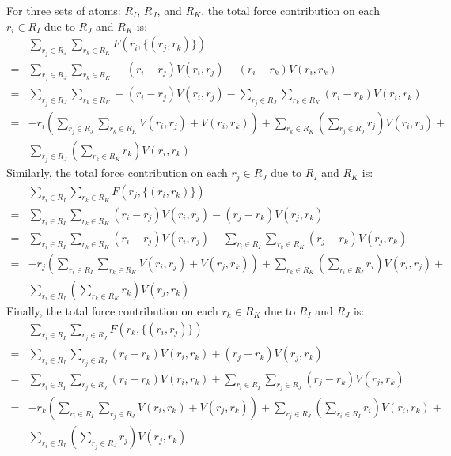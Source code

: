 \documentclass[letterpaper,12pt]{article}
\begin{document}
For three sets of atoms: $R_I$, $R_J$, and $R_K$, the total force
contribution on each $r_i \in R_I$ due to $R_J$ and $R_K$ is:
\begin{align*}
& \sum\limits_{r_j \in R_J} \sum\limits_{r_k \in R_K} F(r_i, \{ (r_j,
r_k) \}) \\
=& \sum\limits_{r_j \in R_J} \sum\limits_{r_k \in R_K} -(r_i -
r_j) V(r_i, r_j) - (r_i - r_k) V(r_i, r_k)\\
=& \sum\limits_{r_j \in R_J} \sum\limits_{r_k \in R_K} -(r_i -
r_j) V(r_i, r_j) - \sum\limits_{r_j \in R_J} \sum\limits_{r_k \in
  R_K} (r_i - r_k) V(r_i, r_k)\\
=&- r_i \left( \sum\limits_{r_j \in R_J} \sum\limits_{r_k \in R_K} V(r_i, r_j) 
+ V(r_i, r_k) \right) +
\sum\limits_{r_k \in R_K} \left( \sum\limits_{r_j \in R_J} r_j \right)
V(r_i, r_j) +\\
& \sum\limits_{r_j \in R_J} \left( \sum\limits_{r_k \in R_K} r_k \right)
V(r_i, r_k)
\end{align*}
Similarly, the total force contribution on each $r_j \in R_J$ due to
$R_I$ and $R_K$ is:
\begin{align*}
& \sum\limits_{r_i \in R_I} \sum\limits_{r_k \in R_K} F(r_j, \{ (r_i,
r_k) \})\\
=& \sum\limits_{r_i \in R_I} \sum\limits_{r_k \in R_K} (r_i - r_j)
V(r_i, r_j) - (r_j - r_k) V(r_j, r_k)\\
=& \sum\limits_{r_i \in R_I} \sum\limits_{r_k \in R_K} (r_i - r_j)
V(r_i, r_j) - \sum\limits_{r_i \in R_I} \sum\limits_{r_k \in R_K} (r_j
- r_k) V(r_j, r_k)\\
=&- r_j \left( \sum\limits_{r_i \in R_I} \sum\limits_{r_k \in R_K}
V(r_i, r_j) + V(r_j, r_k) \right) + \sum\limits_{r_k \in R_K} \left(
\sum\limits_{r_i \in R_I} r_i \right) V(r_i, r_j) +\\ 
& \sum\limits_{r_i \in R_I} \left( \sum\limits_{r_k \in R_K} r_k \right)
V(r_j, r_k)
\end{align*}
Finally, the total force contribution on each $r_k \in R_K$ due to
$R_I$ and $R_J$ is:
\begin{align*}
& \sum\limits_{r_i \in R_I} \sum\limits_{r_j \in R_J} F(r_k, \{ (r_i,
r_j) \})\\
=& \sum\limits_{r_i \in R_I} \sum\limits_{r_j \in R_J} (r_i - r_k)
V(r_i, r_k) + (r_j - r_k) V(r_j, r_k)\\
=& \sum\limits_{r_i \in R_I} \sum\limits_{r_j \in R_J} (r_i - r_k)
V(r_i, r_k) + \sum\limits_{r_i \in R_I} \sum\limits_{r_j \in R_J} (r_j
- r_k) V(r_j, r_k)\\
=&- r_k \left( \sum\limits_{r_i \in R_I} \sum\limits_{r_j \in R_J}
V(r_i, r_k) + V(r_j, r_k) \right) + \sum\limits_{r_j \in R_J} \left(
\sum\limits_{r_i \in R_I} r_i \right) V(r_i, r_k) +\\ 
& \sum\limits_{r_i \in R_I} \left( \sum\limits_{r_j \in R_J} r_j \right)
V(r_j, r_k)
\end{align*}
\end{document}
